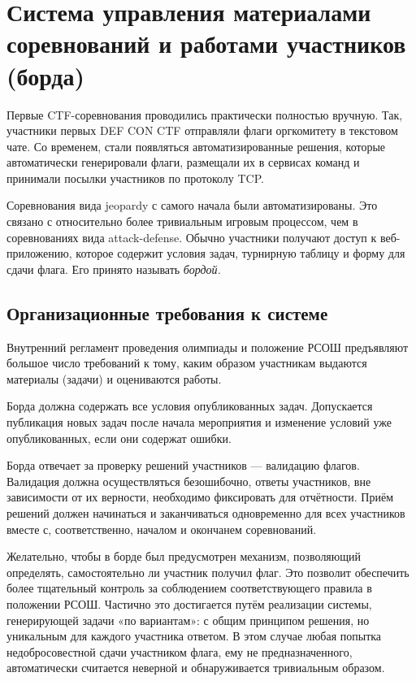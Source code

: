 \section{Система управления материалами соревнований и работами участников (борда)}

Первые CTF-соревнования проводились практически полностью вручную. Так, участники первых DEF CON CTF отправляли флаги оргкомитету в текстовом чате. Со временем, стали появляться автоматизированные решения, которые автоматически генерировали флаги, размещали их в сервисах команд и принимали посылки участников по протоколу TCP.


Соревнования вида jeopardy с самого начала были автоматизированы. Это связано с относительно более тривиальным игровым процессом, чем в соревнованиях вида attack-defense. Обычно участники получают доступ к веб-приложению, которое содержит условия задач, турнирную таблицу и форму для сдачи флага. Его принято называть \textit{бордой.}



\subsection{Организационные требования к системе}

Внутренний регламент проведения олимпиады и положение РСОШ предъявляют большое число требований к тому, каким образом участникам выдаются материалы (задачи) и оцениваются работы.

Борда должна содержать все условия опубликованных задач. Допускается публикация новых задач после начала мероприятия и изменение условий уже опубликованных, если они содержат ошибки.

Борда отвечает за проверку решений участников — валидацию флагов. Валидация должна осуществляться безошибочно, ответы участников, вне зависимости от их верности, необходимо фиксировать для отчётности. Приём решений должен начинаться и заканчиваться одновременно для всех участников вместе с, соответственно, началом и окончанем соревнований.

Желательно, чтобы в борде был предусмотрен механизм, позволяющий определять, самостоятельно ли участник получил флаг. Это позволит обеспечить более тщательный контроль за соблюдением соответствующего правила в положении РСОШ. Частично это достигается путём реализации системы, генерирующей задачи «по вариантам»: с общим принципом решения, но уникальным для каждого участника ответом. В этом случае любая попытка недобросовестной сдачи участником флага, ему не предназначенного, автоматически считается неверной и обнаруживается тривиальным образом.

